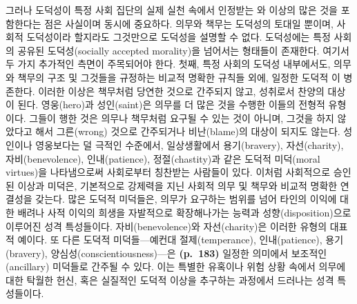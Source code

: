 그러나 도덕성이 특정 사회 집단의 실제 실천 속에서 인정받는
와  이상의 많은 것을
포함한다는 점은 사실이며 동시에 중요하다. 의무와 책무는 도덕성의 토대일
뿐이며, 사회적 도덕성이라 할지라도 그것만으로 도덕성을 설명할 수 없다.
도덕성에는 특정 사회의 공유된 도덕성(socially accepted morality)을
넘어서는 형태들이 존재한다. 여기서 두 가지 추가적인 측면이 주목되어야
한다. 첫째, 특정 사회의 도덕성 내부에서도, 의무와 책무의 구조 및
그것들을 규정하는 비교적 명확한 규칙들 외에, 일정한 도덕적
이 병존한다. 이러한 이상은 책무처럼 당연한 것으로
간주되지 않고, 성취로서 찬양의 대상이 된다. 영웅(hero)과 성인(saint)은
의무를  더 많은 것을 수행한 이들의 전형적 유형이다.
그들이 행한 것은 의무나 책무처럼 요구될 수 있는 것이 아니며, 그것을 하지
않았다고 해서 그른(wrong) 것으로 간주되거나 비난(blame)의 대상이 되지도
않는다. 성인이나 영웅보다는 덜 극적인 수준에서, 일상생활에서
용기(bravery), 자선(charity), 자비(benevolence), 인내(patience),
정절(chastity)과 같은 도덕적 미덕(moral virtues)을 나타냄으로써
사회로부터 칭찬받는 사람들이 있다. 이처럼 사회적으로 승인된 이상과
미덕은, 기본적으로 강제력을 지닌 사회적 의무 및 책무와 비교적 명확한
연결성을 갖는다. 많은 도덕적 미덕들은, 의무가 요구하는 범위를 넘어
타인의 이익에 대한 배려나 사적 이익의 희생을 자발적으로 확장해나가는
능력과 성향(disposition)으로 이루어진 성격 특성들이다.
자비(benevolence)와 자선(charity)은 이러한 유형의 대표적 예이다. 또 다른
도덕적 미덕들---예컨대 절제(temperance), 인내(patience), 용기(bravery),
양심성(conscientiousness)---은 \textbf{(p.~183)} 일정한 의미에서
보조적인(ancillary) 미덕들로 간주될 수 있다. 이는 특별한 유혹이나 위험
상황 속에서 의무에 대한 탁월한 헌신, 혹은 실질적인 도덕적 이상을
추구하는 과정에서 드러나는 성격 특성들이다.

